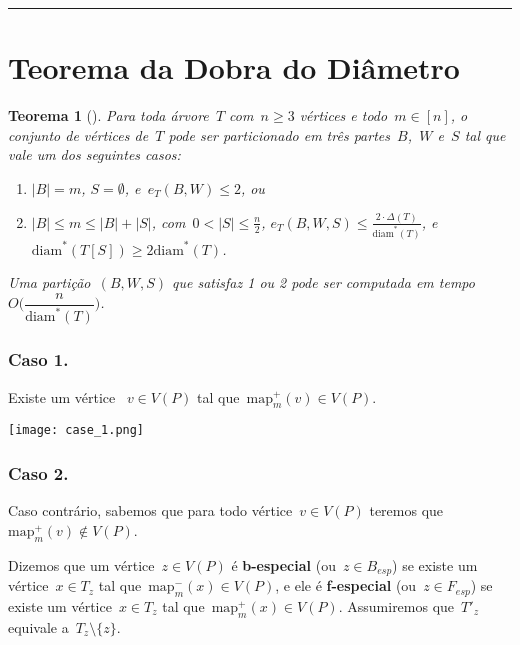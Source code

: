 \documentclass[a0,portrait]{a0poster}
\newtheorem{teo}{Teorema}
\newcommand{\diam}{\mathrm{diam}}
\newcommand{\map}{\mathrm{map}}
\begin{document}
\begin{multicols}{3}
\noindent\rule[0.5ex]{\linewidth}{1pt}



\section*{Teorema da Dobra do Diâmetro}

\begin{teo}[]
    Para toda árvore~$T$ com~${n\ge 3}$ vértices e 
    todo~${m\in [n]}$,
    o conjunto de vértices de~$T$ pode ser particionado em 
    três partes~$B$,~$W$ e~$S$ tal que vale um dos 
    seguintes casos:
    \begin{enumerate}
    \item ${|B|=m}$, ${S=\emptyset}$, e~${e_T(B,W)\le 2}$, ou
    \item ${|B|\le m\le |B|+|S|}$, 
    com~${0<|S|\le\frac{n}{2}}$,
    ${e_T(B,W,S)\le \frac{2\cdot 
    \Delta(T)}{\diam^*(T)}}$, 
    e~${\diam^*(T[S])\ge 2\diam^*(T)}$.
    \end{enumerate}
    Uma partição~$(B,W,S)$ que satisfaz 1 ou 2 pode ser
    computada em tempo~${O\Big(\dfrac{n}{\diam^*(T)}\Big)}$.
\end{teo}


\subsubsection*{Caso 1.}
    Existe um vértice ~${v\in V(P)}$ tal 
    que~${\map_m^+(v)\in V(P)}$.
\begin{center}
\texttt{[image: case\_1.png]}
\end{center}
\subsubsection*{Caso 2.}
    Caso contrário, sabemos que para todo vértice~${v\in V(P)}$
    teremos que~${\map_m^+(v)\not\in V(P)}$.

    Dizemos que um vértice~${z\in V(P)}$ é \textbf{b-especial}
    (ou~${z\in B_{esp}}$)
    se existe um vértice~${x\in T_z}$ tal 
    que~${\map^{-}_m(x)\in V(P)}$, e ele é
    \textbf{f-especial} (ou~${z\in F_{esp}}$) 
    se existe um vértice~${x\in T_z}$
    tal que~${\map^{+}_m(x)\in V(P)}$.
    Assumiremos que~$T'_z$ equivale a~$T_z\setminus \{z\}$.


\end{multicols}
\end{document}
